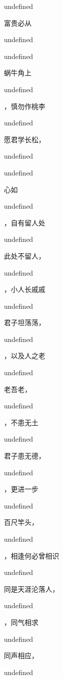 \documentclass[12pt, a4paper, addpoints]{exam}
\begin{document}
\begin{multicols}{2}
\begin{questions}
undefined

\question[2] 富贵必从\fillin

undefined

\question[2] 

undefined

\question[2] 蜗牛角上\fillin

undefined

\question[2] \fillin，慎勿作桃李

undefined

\question[2] 愿君学长松，\fillin

undefined

\question[2] 

undefined

\question[2] 心如\fillin

undefined

\question[2] \fillin，自有留人处

undefined

\question[2] 此处不留人，\fillin

undefined

\question[2] \fillin，小人长戚戚

undefined

\question[2] 君子坦荡荡，\fillin

undefined

\question[2] \fillin，以及人之老

undefined

\question[2] 老吾老，\fillin

undefined

\question[2] \fillin，不患无土

undefined

\question[2] 君子患无德，\fillin

undefined

\question[2] \fillin，更进一步

undefined

\question[2] 百尺竿头，\fillin

undefined

\question[2] \fillin，相逢何必曾相识

undefined

\question[2] 同是天涯沦落人，\fillin

undefined

\question[2] \fillin，同气相求

undefined

\question[2] 同声相应，\fillin

undefined


\end{questions}
\end{multicols}
\end{document}
